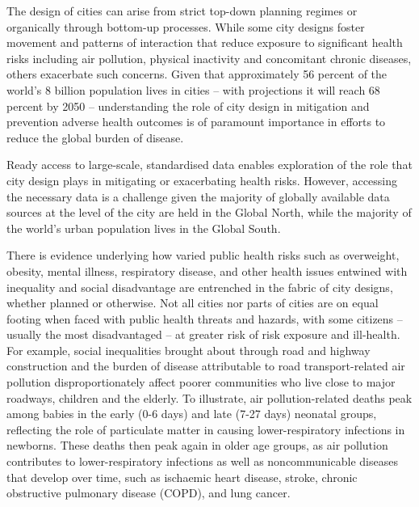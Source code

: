 \documentclass[preprint,12pt]{elsarticle}
\begin{document}
The design of cities can arise from strict top-down planning regimes\cite{mundigo1977city} or organically through bottom-up processes\cite{batty2017thinking}. While some city designs foster movement and patterns of interaction that reduce exposure to significant health risks including air pollution, physical inactivity and concomitant chronic diseases, others exacerbate such concerns\cite{Wijnands2022, Stevenson2016,wang2023flood, stanley2022managing}. Given that approximately 56 percent of the world's 8 billion population lives in cities -- with projections it will reach 68 percent by 2050\cite{WHO2023}  -- understanding the role of city design in mitigation and prevention adverse health outcomes is of paramount importance in efforts to reduce the global burden of disease. 

Ready access to large-scale, standardised data enables exploration of the role that city design plays in mitigating or exacerbating health risks. However, accessing the necessary data is a challenge given the majority of globally available data sources at the level of the city are held in the Global North, while the majority of the world's urban population lives in the Global South\cite{Smit2021}.

There is evidence underlying  how varied public health risks such as overweight, obesity, mental illness, respiratory disease, and other health issues entwined with inequality and social disadvantage are entrenched in the fabric of city designs, whether planned or otherwise\cite{borrell2013factors,xing2016impact,yuchi2020road}. Not all cities nor parts of cities are on equal footing when faced with public health threats and hazards, with some citizens -- usually the most disadvantaged -- at greater risk of risk exposure and ill-health\cite{KRISHNA2021102046}. For example, social inequalities brought about through road and highway construction\cite{carpenter2010poverty,archer2020white} and the burden of disease attributable to road transport-related air pollution disproportionately affect poorer communities who live close to major roadways, children and the elderly. To illustrate, air pollution-related deaths peak among babies in the early (0-6 days) and late (7-27 days) neonatal groups, reflecting the role of particulate matter in causing lower-respiratory infections in newborns. These deaths then peak again in older age groups, as air pollution contributes to lower-respiratory infections as well as noncommunicable diseases that develop over time, such as ischaemic heart disease, stroke, chronic obstructive pulmonary disease (COPD), and lung cancer\cite{boogaard2022long}. 
\end{document}
